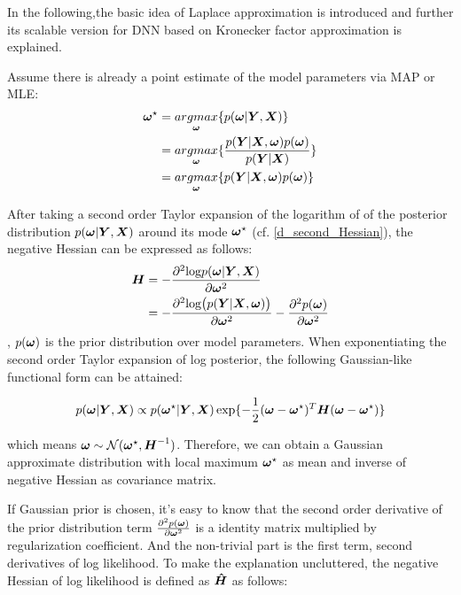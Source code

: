 In the following,the basic idea of Laplace approximation is introduced and further its scalable version for DNN based on Kronecker factor approximation is explained.

Assume there is already a point estimate of the model parameters via \gls{MAP} or \gls{MLE}:
\begin{equation}
\begin{aligned} \label{point estimate}
\boldsymbol \omega^\star &= \underset{\boldsymbol \omega}{argmax}\{p(\boldsymbol \omega|\boldsymbol Y,\boldsymbol X)\} \\
&= \underset{\boldsymbol \omega}{argmax}\{\frac{p(\boldsymbol Y|\boldsymbol X, \boldsymbol \omega) p(\boldsymbol \omega)}{p(\boldsymbol Y | \boldsymbol X)}\} \\
&= \underset{\boldsymbol \omega}{argmax}\{p(\boldsymbol Y|\boldsymbol X, \boldsymbol \omega) p(\boldsymbol \omega)\}
\end{aligned}
\end{equation}


After taking a second order Taylor expansion of the logarithm of of the posterior distribution $p(\boldsymbol \omega | \boldsymbol Y, \boldsymbol X)$ around its mode $\boldsymbol \omega^\star$ (cf. \ref{d_second_Hessian}), the negative Hessian can be expressed as follows:
\[
\begin{aligned}
\boldsymbol H &= -\frac{\partial^2\text{log} p(\boldsymbol \omega|\boldsymbol Y, \boldsymbol X)}{\partial \boldsymbol \omega^2}\\
&=-\frac{\partial^2\text{log}\big(p(\boldsymbol Y|\boldsymbol X, \boldsymbol \omega)\big)}{\partial \boldsymbol \omega^2} - \frac{\partial^2p(\boldsymbol \omega)}{\partial\boldsymbol \omega^2}
\end{aligned}
\]
, $p(\boldsymbol \omega)$ is the prior distribution over model parameters.
When exponentiating the second order Taylor expansion of log posterior, the following Gaussian-like functional form can be attained: 

\begin{equation}
\begin{aligned}\label{gaussian form}
p(\boldsymbol \omega | \boldsymbol Y, \boldsymbol X) \propto p(\boldsymbol \omega^\star|\boldsymbol Y, \boldsymbol X)\exp\{-\frac{1}{2}(\boldsymbol \omega - \boldsymbol \omega^\star)^T\boldsymbol H (\boldsymbol \omega - \boldsymbol \omega^\star)\}
\end{aligned}
\end{equation}

which means $\boldsymbol \omega \sim \mathcal N(\boldsymbol \omega^\star, \boldsymbol H ^{-1})$. Therefore, we can obtain a Gaussian approximate distribution with local maximum $\boldsymbol \omega^\star$ as mean and inverse of negative Hessian as covariance matrix.

If Gaussian prior is chosen, it's easy to know that the second order derivative of the prior distribution term $\frac{\partial^2p(\boldsymbol \omega)}{\partial\boldsymbol \omega^2}$ is a identity matrix multiplied by regularization coefficient. And the non-trivial part is the first term, second derivatives of log likelihood. To make the explanation uncluttered, the negative Hessian of log likelihood is defined as $\boldsymbol{\hat{H}}$ as follows:

